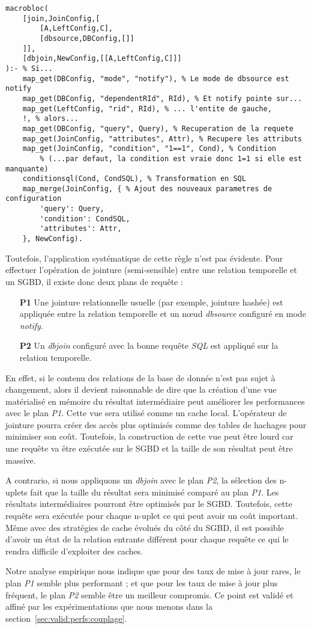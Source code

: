 \begin{lstlisting}
macrobloc(
    [join,JoinConfig,[
        [A,LeftConfig,C],
        [dbsource,DBConfig,[]]
    ]],
    [dbjoin,NewConfig,[[A,LeftConfig,C]]]
):- % Si...
    map_get(DBConfig, "mode", "notify"), % Le mode de dbsource est notify
    map_get(DBConfig, "dependentRId", RId), % Et notify pointe sur...
    map_get(LeftConfig, "rid", RId), % ... l'entite de gauche,
    !, % alors...
    map_get(DBConfig, "query", Query), % Recuperation de la requete
    map_get(JoinConfig, "attributes", Attr), % Recupere les attributs
    map_get(JoinConfig, "condition", "1==1", Cond), % Condition
        % (...par defaut, la condition est vraie donc 1=1 si elle est manquante)
    conditionsql(Cond, CondSQL), % Transformation en SQL
    map_merge(JoinConfig, { % Ajout des nouveaux parametres de configuration
        'query': Query,
        'condition': CondSQL, 
        'attributes': Attr,
    }, NewConfig).
\end{lstlisting}

Toutefois, l'application systématique de cette règle n'est pas évidente. Pour effectuer l'opération de jointure (semi-sensible) entre une relation temporelle et un SGBD, il existe donc deux plans de requête :
\begin{itemize}
    \item[\textbf{P1}] Une jointure relationnelle usuelle (par exemple, jointure hashée) est appliquée entre la relation temporelle et un nœud \textit{dbsource} configuré en mode \textit{notify}.
    \item[\textbf{P2}] Un \textit{dbjoin} configuré avec la bonne requête \textit{SQL} est appliqué sur la relation temporelle.
\end{itemize}

En effet, si le contenu des relations de la base de donnée n'est pas sujet à changement, alors il devient raisonnable de dire que la création d'une vue matérialisé en mémoire du résultat intermédiaire peut améliorer les performances avec le plan \textit{P1}. Cette vue sera utilisé comme un cache local. L'opérateur de jointure pourra créer des accès plus optimisés comme des tables de hachages pour minimiser son coût. Toutefois, la construction de cette vue peut être lourd car une requête va être exécutée sur le SGBD et la taille de son résultat peut être massive.

A contrario, si nous appliquons un \textit{dbjoin} avec le plan \textit{P2}, la sélection des n-uplets fait que la taille du résultat sera minimisé comparé au plan \textit{P1}. Les résultats intermédiaires pourront être optimisés par le SGBD. Toutefois, cette requête sera exécutée pour chaque n-uplet ce qui peut avoir un coût important. Même avec des stratégies de cache évolués du côté du SGBD, il est possible d'avoir un état de la relation entrante différent pour chaque requête ce qui le rendra difficile d'exploiter des caches.

Notre analyse empirique nous indique que pour des taux de mise à jour rares, le plan \textit{P1} semble plus performant ; et que pour les taux de mise à jour plus fréquent, le plan \textit{P2} semble être un meilleur compromis. Ce point est validé et affiné par les expérimentations que nous menons dans la section~\ref{sec:valid:perfs:couplage}.
